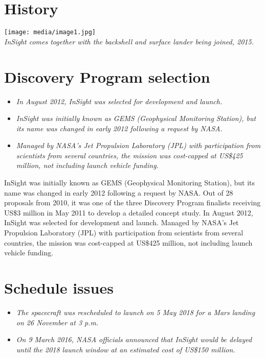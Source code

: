 \section{History}\label{history}

\texttt{[image: media/image1.jpg]}\\
\emph{InSight comes together with the backshell and surface lander being
joined, 2015.}

\section{Discovery Program selection}\label{discovery-program-selection}

\begin{itemize}
\item
  \emph{In August 2012, InSight was selected for development and
  launch.}
\item
  \emph{InSight was initially known as GEMS (Geophysical Monitoring
  Station), but its name was changed in early 2012 following a request
  by NASA.}
\item
  \emph{Managed by NASA's Jet Propulsion Laboratory (JPL) with
  participation from scientists from several countries, the mission was
  cost-capped at US\$425 million, not including launch vehicle funding.}
\end{itemize}

InSight was initially known as GEMS (Geophysical Monitoring Station),
but its name was changed in early 2012 following a request by NASA. Out
of 28 proposals from 2010, it was one of the three Discovery Program
finalists receiving US\$3 million in May 2011 to develop a detailed
concept study. In August 2012, InSight was selected for development and
launch. Managed by NASA's Jet Propulsion Laboratory (JPL) with
participation from scientists from several countries, the mission was
cost-capped at US\$425 million, not including launch vehicle funding.

\section{Schedule issues}\label{schedule-issues}

\begin{itemize}
\item
  \emph{The spacecraft was rescheduled to launch on 5 May 2018 for a
  Mars landing on 26 November at 3 p.m.}
\item
  \emph{On 9 March 2016, NASA officials announced that InSight would be
  delayed until the 2018 launch window at an estimated cost of US\$150
  million.}
\end{itemize}

